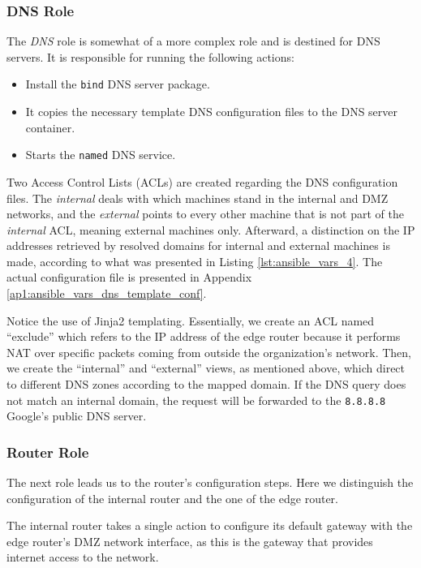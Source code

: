 \subsubsection{DNS Role} \label{sec:ansible_dns_role}

The \textit{DNS} role is somewhat of a more complex role and is destined for DNS servers. It is responsible for running the following actions:

\begin{itemize}
    \item Install the \texttt{bind} DNS server package.
    \item It copies the necessary template DNS configuration files to the DNS server container.
    \item Starts the \texttt{named} DNS service.
\end{itemize}

Two Access Control Lists (ACLs) are created regarding the DNS configuration files. The \textit{internal} deals with which machines stand in the internal and DMZ networks, and the \textit{external} points to every other machine that is not part of the \textit{internal} ACL, meaning external machines only. Afterward, a distinction on the IP addresses retrieved by resolved domains for internal and external machines is made, according to what was presented in Listing \ref{lst:ansible_vars_4}. The actual configuration file is presented in Appendix \ref{ap1:ansible_vars_dns_template_conf}.

Notice the use of Jinja2 templating. Essentially, we create an ACL named ``exclude'' which refers to the IP address of the edge router because it performs NAT over specific packets coming from outside the organization's network. Then, we create the ``internal'' and ``external'' views, as mentioned above, which direct to different DNS zones according to the mapped domain. If the DNS query does not match an internal domain, the request will be forwarded to the \texttt{8.8.8.8} Google's public DNS server.

\subsubsection{Router Role} \label{sec:ansible_router_role}

The next role leads us to the router's configuration steps. Here we distinguish the configuration of the internal router and the one of the edge router. 

The internal router takes a single action to configure its default gateway with the edge router's DMZ network interface, as this is the gateway that provides internet access to the network.

